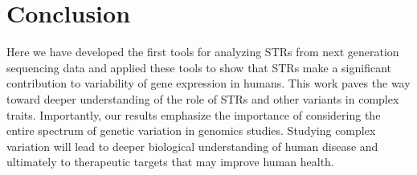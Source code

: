 \section{Conclusion}
Here we have developed the first tools for analyzing STRs from next generation sequencing data and applied these tools to show that STRs make a significant contribution to variability of gene expression in humans. This work paves the way toward deeper understanding of the role of STRs and other variants in complex traits. Importantly, our results emphasize the importance of considering the entire spectrum of genetic variation in genomics studies. Studying complex variation will lead to deeper biological understanding of human disease and ultimately to therapeutic targets that may improve human health.
